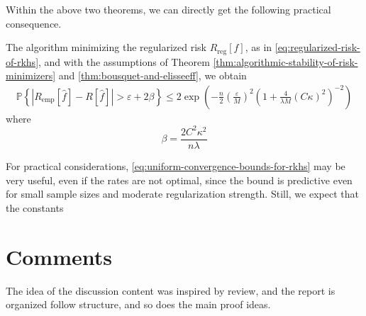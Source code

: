 \documentclass[a4paper, 12pt, mtpro2, authoryear]{elegantpaper}
\begin{document}
Within the above two theorems, we can directly get the following practical consequence.
\begin{corollary}
    The algorithm minimizing the regularized risk $R_{\text{reg}}[f]$, as in \eqref{eq:regularized-risk-of-rkhs}, and with the assumptions of Theorem \ref{thm:algorithmic-stability-of-risk-minimizers} and \ref{thm:bousquet-and-elisseeff}, we obtain
    \begin{eqnarray}
        \label{eq:uniform-convergence-bounds-for-rkhs}
        \mathbb{P}\left\{\left|R_{\text{emp}}[\hat{f}]-R[\hat{f}]\right|>\varepsilon+2\beta\right\}\leq 2\exp\left(-\frac{n}{2}\left(\frac{\varepsilon}{M}\right)^{2}\left(1+\frac{4}{\lambda M}(C \kappa)^{2}\right)^{-2}\right)
    \end{eqnarray}
    where
    \begin{equation*}
        \beta=\frac{2C^{2}\kappa^{2}}{n\lambda}
    \end{equation*}
\end{corollary}

\begin{remark}
    For practical considerations, \eqref{eq:uniform-convergence-bounds-for-rkhs} may be very useful, even if the rates are not optimal, since the bound is predictive even for small sample sizes and moderate regularization strength. Still, we expect that the constants
\end{remark}

\section*{Comments}

The idea of the discussion content was inspired by \cite[Section 3]{hofmann_kernel_2008} review, and the report is organized follow \cite[Chapter 12]{scholkopf_learning_2001} structure, and so does the main proof ideas.


\end{document}
